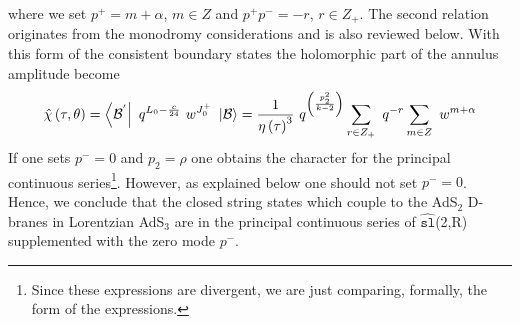 \documentclass[a4paper,12pt]{article}
\begin{document}
where we set $p^{+}=m+\alpha $, $m\in Z$ and $p^{+}p^{-}=-r$, $r\in Z_{+}$.
The second relation originates from the monodromy considerations \cite{bars1}
and is also reviewed below. With this form of the consistent boundary states
the holomorphic part of the annulus amplitude become
\begin{equation}
\hat{\chi}\left( \tau ,\theta \right) =\left\langle
\mathcal{B}^{^{\prime
}}\right| \ q^{L_{0}-\frac{c}{24}}\ w^{J_{0}^{+}}\ \left| \mathcal{B}%
\right\rangle =\frac{1}{\eta \left( \tau \right) ^{3}}\ q^{\left( \frac{%
p_{2}^{2}}{k-2}\right) }\sum_{r\in Z_{+}}\ q^{-r}\sum_{m\in Z}\ w^{m+\alpha }
\label{holo-amp}
\end{equation}
If one sets $p^{-}=0$ and $p_{2}=\rho $ one obtains the character for the
principal continuous series\footnote{%
Since these expressions are divergent, we are just comparing, formally, the
form of the expressions.}. However, as explained below one should not set $%
p^{-}=0$. Hence, we conclude that the closed string states which couple to
the AdS$_{2}$ D-branes in Lorentzian AdS$_{3}$ are in the principal
continuous series of $\widehat{\mathtt{sl}}$(2,R) supplemented with the zero
mode $p^{-}$.
\end{document}
